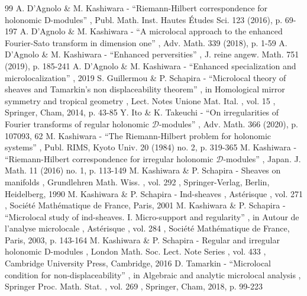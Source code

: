 \documentclass[11pt]{article}
\numberwithin{equation}{section}
\let\mathcal\mathscr
\theoremstyle{plain}
\theoremstyle{definition}
\begin{document}

\begin{thebibliography}{99}
 A. D’Agnolo \& M. Kashiwara - “Riemann-Hilbert correspondence for holonomic D-modules” , Publ. Math. Inst. Hautes Études Sci. 123 (2016), p. 69-197
 A. D’Agnolo \& M. Kashiwara - “A microlocal approach to the enhanced Fourier-Sato transform in dimension one” , Adv. Math. 339 (2018), p. 1-59
 A. D’Agnolo \& M. Kashiwara - “Enhanced perversities” , J. reine angew. Math. 751 (2019), p. 185-241
 A. D’Agnolo \& M. Kashiwara - “Enhanced specialization and microlocalization” , 2019
 S. Guillermou \& P. Schapira - “Microlocal theory of sheaves and Tamarkin’s non displaceability theorem” , in Homological mirror symmetry and tropical geometry , Lect. Notes Unione Mat. Ital. , vol. 15 , Springer, Cham, 2014, p. 43-85
 Y. Ito \& K. Takeuchi - “On irregularities of Fourier transforms of regular holonomic $\mathcal{D}$-modules” , Adv. Math. 366 (2020), p. 107093, 62
 M. Kashiwara - “The Riemann-Hilbert problem for holonomic systems” , Publ. RIMS, Kyoto Univ. 20 (1984) no. 2, p. 319-365
 M. Kashiwara - “Riemann-Hilbert correspondence for irregular holonomic $\mathcal{D}$-modules” , Japan. J. Math. 11 (2016) no. 1, p. 113-149
 M. Kashiwara \& P. Schapira - Sheaves on manifolds , Grundlehren Math. Wiss. , vol. 292 , Springer-Verlag, Berlin, Heidelberg, 1990
 M. Kashiwara \& P. Schapira - Ind-sheaves , Astérisque , vol. 271 , Société Mathématique de France, Paris, 2001
 M. Kashiwara \& P. Schapira - “Microlocal study of ind-sheaves. I. Micro-support and regularity” , in Autour de l’analyse microlocale , Astérisque , vol. 284 , Société Mathématique de France, Paris, 2003, p. 143-164
 M. Kashiwara \& P. Schapira - Regular and irregular holonomic D-modules , London Math. Soc. Lect. Note Series , vol. 433 , Cambridge University Press, Cambridge, 2016
 D. Tamarkin - “Microlocal condition for non-displaceability” , in Algebraic and analytic microlocal analysis , Springer Proc. Math. Stat. , vol. 269 , Springer, Cham, 2018, p. 99-223
\end{thebibliography}
\end{document}
